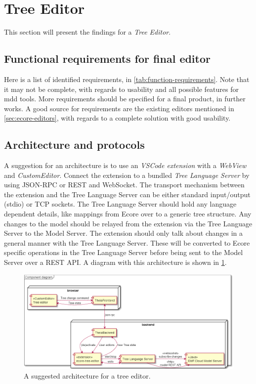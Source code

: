 \section{Tree Editor}\label{sec:result-tree-editor}

This section will present the findings for a \emph{Tree Editor}.

\subsection{Functional requirements for final editor}

Here is a list of identified requirements, in \cref{tab:function-requirements}.
Note that it may not be complete, with regards to usability and all possible features for \gls{mdd} tools.
More requirements should be specified for a final product, in further works.
A good source for requirements are the existing editors mentioned in \cref{sec:ecore-editors}, with regards to a complete solution with good usability.




\subsection{Architecture and protocols}

A suggestion for an architecture is to use an \emph{VSCode extension} with a \emph{WebView} and \emph{CustomEditor}.
Connect the extension to a bundled \emph{Tree Language Server} by using \gls{JSON-RPC} or \gls{REST} and \gls{WebSocket}.
The transport mechanism between the extension and the Tree Language Server can be either standard input/output (stdio) or TCP sockets.
The Tree Language Server should hold any language dependent details, like mappings from \gls{Ecore} over to a generic tree structure.
Any changes to the model should be relayed from the extension via the Tree Language Server to the Model Server.
The extension should only talk about changes in a general manner with the Tree Language Server.
These will be converted to \gls{Ecore} specific operations in the Tree Language Server before being sent to the Model Server over a \gls{REST} \acrshort{API}.
A diagram with this architecture is shown in \cref{fig:tree-editor-architecture}.

\begin{figure}[htbp]
  \centering
  \includegraphics[width=\textwidth]{figures/tree-editor-component-diagram.png}
  \caption[Tree Editor Architecture]{A suggested architecture for a tree editor.}\label{fig:tree-editor-architecture}
\end{figure}

